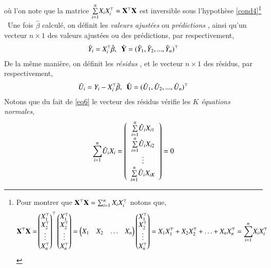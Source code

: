 \documentclass[10pt, reqno]{amsart}
\begin{document}
où l'on note que la matrice $\underset{i=1}{\overset{n}{\sum}} X_iX_i^\top = \mathbf X^\top\mathbf X$ est inversible sous l'hypothèse \eqref{cond4}\footnote{Pour montrer que 
$\mathbf X^\top\mathbf X = \sum_{i=1}^n X_iX_i^\top$ notons que,
\begin{align*}
\mathbf X^\top\mathbf X=&
\begin{pmatrix}
X_1^\top\\
X_2^\top\\
\vdots\\
X_n^\top
\end{pmatrix}^\top
\begin{pmatrix}
X_1^\top\\
X_2^\top\\
\vdots\\
X_n^\top
\end{pmatrix}
= 
\begin{pmatrix}
X_1&X_2&\ldots&X_n
\end{pmatrix}
\begin{pmatrix}
X_1^\top\\
X_2^\top\\
\vdots\\
X_n^\top
\end{pmatrix}
= X_1X_1^\top + X_2X_2^\top+\ldots+X_nX_n^\top
=\underset{i=1}{\overset{n}{\sum}} X_iX_i^\top
\end{align*}

}\\\
Une fois $\hat{\beta}$ calculé, on définit les \emph{valeurs ajustées} ou \emph{prédictions} , ainsi qu'un vecteur $n\times 1$ des valeurs ajustées ou des prédictions, par respectivement,
\begin{align*}
\hat{Y}_i = X_i^\top\hat{\beta}, \ \ \hat{\mathbf Y} = (\hat{Y}_1,  \hat{Y}_2,..., \hat{Y}_n)^\top
\end{align*}
De la même manière, on définit  les \emph{résidus}  , et le vecteur  $n\times 1$ des résidus, par respectivement,
\begin{align*}
\hat{U}_i = Y_i - X_i^\top\hat{\beta}, \ \ \hat{\mathbf U} = (\hat{U}_1, \hat{U}_2,...,\hat{U}_n)^\top
\end{align*}
Notons que du fait de \eqref{eq6} le vecteur des résidus vérifie les $K$  \emph{équations normales},
\begin{align}
 \underset{i=1}{\overset{n}{\sum}}\hat{U}_iX_i=
\left(
\begin{array}{c}
\underset{i=1}{\overset{n}{\sum}}\hat{U}_iX_{i1}\\
\underset{i=1}{\overset{n}{\sum}}\hat{U}_iX_{i2}\\
\vdots\\
\underset{i=1}{\overset{n}{\sum}}\hat{U}_iX_{iK}
\end{array}
\right)
=0
\label{eq10}
\end{align}
\end{document}
